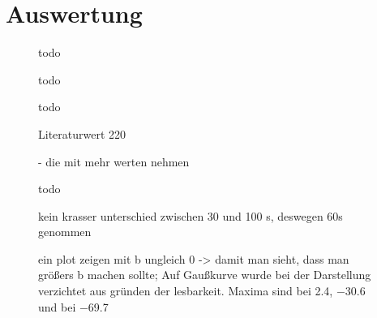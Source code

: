 \section{Auswertung}
\begin{figure}[H]
    \centering
    
    \caption{todo}
    \label{fig:Sonnenabbild}
\end{figure}

\begin{figure}[H]
    \centering
    
    \caption{todo}
    \label{fig:Sonnenkreuz_Az}
\end{figure}

\begin{figure}[H]
    \centering
    
    \caption{todo}
    \label{fig:Sonnenkreuz_Alt}
\end{figure}

\begin{figure}[H]
    \centering
    
    \caption{Literaturwert \SI{220}{} \cite{LSR}}
    \label{fig:VvonR}
\end{figure}

%     

\begin{figure}[H]
    \centering
       
    \caption{- die mit mehr werten nehmen}
    \label{fig:Milchstrassesafe}
\end{figure}

\begin{figure}[H]
    \centering
       
    \caption{todo}
    \label{fig:Belichtungszeit}
\end{figure}

\begin{figure}[H]
    \centering
       
    \caption{kein krasser unterschied zwischen 30 und 100 s, deswegen 60s genommen}
    \label{fig:BelichtungszeitExtremal}
\end{figure}

\begin{figure}[H]
    \centering
       
    \caption{ein plot zeigen mit b ungleich 0 -> damit man sieht, dass man größers b machen sollte; Auf Gaußkurve wurde bei der Darstellung verzichtet aus gründen der lesbarkeit. Maxima sind bei \SI{2.4}{}, \SI{-30.6}{} und bei \SI{-69.7}{}}
    \label{fig:bungleichnull}
\end{figure}